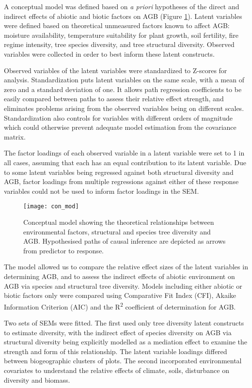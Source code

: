 \documentclass[11pt,a4paper]{article}
\begin{document}
A conceptual model was defined based on \textit{a priori} hypotheses of the direct and indirect effects of abiotic and biotic factors on AGB (Figure \ref{con_mod}). Latent variables were defined based on theoretical unmeasured factors known to affect AGB: moisture availability, temperature suitability for plant growth, soil fertility, fire regime intensity, tree species diversity, and tree structural diversity. Observed variables were collected in order to best inform these latent constructs.

Observed variables of the latent variables were standardized to Z-scores for analysis. Standardization puts latent variables on the same scale, with a mean of zero and a standard deviation of one. It allows path regression coefficients to be easily compared between paths to assess their relative effect strength, and eliminates problems arising from the observed variables being on different scales. Standardization also controls for variables with different orders of magnitude which could otherwise prevent adequate model estimation from the covariance matrix.

The factor loadings of each observed variable in a latent variable were set to 1 in all cases, assuming that each has an equal contribution to its latent variable. Due to some latent variables being regressed against both structural diversity and AGB, factor loadings from multiple regressions against either of these response variables could not be used to inform factor loadings in the SEM.

\begin{figure}[H]
\centering
	\texttt{[image: con\_mod]}
	\caption{Conceptual model showing the theoretical relationships between environmental factors, structural and species tree diversity and AGB. Hypothesised paths of causal inference are depicted as arrows from predictor to response.}
	\label{con_mod}
\end{figure}

The model allowed us to compare the relative effect sizes of the latent variables in determining AGB, and to assess the indirect effects of abiotic environment on AGB via species and structural tree diversity. Models including either abiotic or biotic factors only were compared using Comparative Fit Index (CFI), Akaike Information Criterion (AIC) and the R\textsuperscript{2} coefficient of determination for AGB. 

Two sets of SEMs were fitted. The first used only tree diversity latent constructs to estimate diversity, with the indirect effect of species diversity on AGB via structural diversity being explicitly modelled as a mediation effect to examine the strength and form of this relationship. The latent variable loadings differed between biogeographic clusters of plots. The second incorporated environmental covariates to understand the relative effects of climate, soils, disturbance on diversity and biomass.
\end{document}
